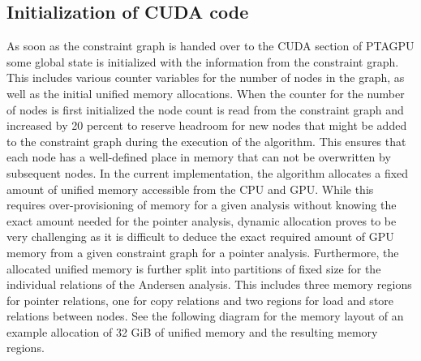 \subsection{Initialization of CUDA code}\label{sec:init}
As soon as the constraint graph is handed over to the CUDA section of PTAGPU some global state is initialized with the information from the constraint graph.
This includes various counter variables for the number of nodes in the graph, as well as the initial unified memory allocations.
When the counter for the number of nodes is first initialized the node count is read from the constraint graph and increased by 20 percent to reserve headroom for new nodes that might be added to the constraint graph during the execution of the algorithm.
This ensures that each node has a well-defined place in memory that can not be overwritten by subsequent nodes.
In the current implementation, the algorithm allocates a fixed amount of unified memory accessible from the CPU and GPU. While this requires over-provisioning of memory for a given analysis without knowing the exact amount needed for the pointer analysis, dynamic allocation proves to be very challenging as it is difficult to deduce the exact required amount of GPU memory from a given constraint graph for a pointer analysis.
Furthermore, the allocated unified memory is further split into partitions of fixed size for the individual relations of the Andersen analysis.
This includes three memory regions for pointer relations, one for copy relations and two regions for load and store relations between nodes.
See the following diagram for the memory layout of an example allocation of 32 GiB of unified memory and the resulting memory regions.
